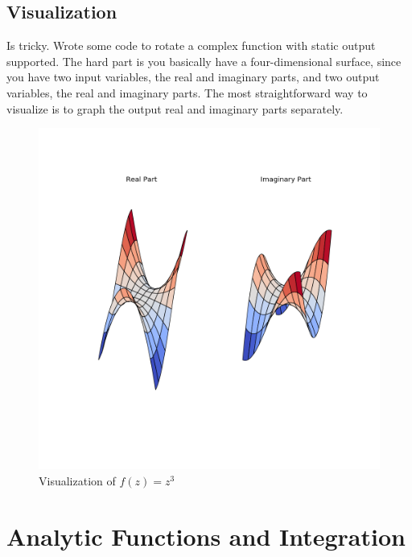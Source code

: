     \subsection{Visualization}
    Is tricky. Wrote some code to rotate a complex function with static
    output supported. The hard part is you basically have a four-dimensional
    surface, since you have two input variables, the real and imaginary
    parts, and two output variables, the real and imaginary parts. The most
    straightforward way to visualize is to graph the output real and
    imaginary parts separately.
    \begin{figure}[H]
        \centering
        \includegraphics[scale=0.3]{./img/examplevis.png}
        \caption{Visualization of $f(z)=z^3$}
    \end{figure}

\section{Analytic Functions and Integration}

